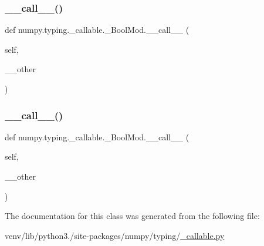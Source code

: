\subsubsection{\texorpdfstring{\+\_\+\+\_\+call\+\_\+\+\_\+()}{\_\_call\_\_()}\hspace{0.1cm}{\footnotesize\ttfamily [4/5]}}
{\footnotesize\ttfamily def numpy.\+typing.\+\_\+callable.\+\_\+\+Bool\+Mod.\+\_\+\+\_\+call\+\_\+\+\_\+ (\begin{DoxyParamCaption}\item[{}]{self,  }\item[{}]{\+\_\+\+\_\+other }\end{DoxyParamCaption})}

\mbox{\label{classnumpy_1_1typing_1_1__callable_1_1__BoolMod_a1720c7fa0fc2105a48d37381db659f32}} 
\subsubsection{\texorpdfstring{\+\_\+\+\_\+call\+\_\+\+\_\+()}{\_\_call\_\_()}\hspace{0.1cm}{\footnotesize\ttfamily [5/5]}}
{\footnotesize\ttfamily def numpy.\+typing.\+\_\+callable.\+\_\+\+Bool\+Mod.\+\_\+\+\_\+call\+\_\+\+\_\+ (\begin{DoxyParamCaption}\item[{}]{self,  }\item[{}]{\+\_\+\+\_\+other }\end{DoxyParamCaption})}



The documentation for this class was generated from the following file\+:\begin{DoxyCompactItemize}
\item 
venv/lib/python3./site-\/packages/numpy/typing/\hyperlink{__callable_8py}{\+\_\+callable.\+py}\end{DoxyCompactItemize}
